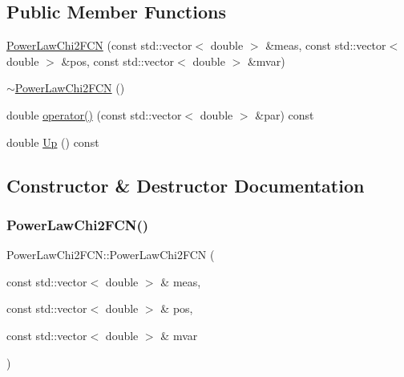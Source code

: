 \subsection*{Public Member Functions}
\begin{DoxyCompactItemize}
\item 
\mbox{\hyperlink{classPowerLawChi2FCN_a8a2490987d4db3ae4af6d45547c7c85e}{Power\+Law\+Chi2\+F\+CN}} (const std\+::vector$<$ double $>$ \&meas, const std\+::vector$<$ double $>$ \&pos, const std\+::vector$<$ double $>$ \&mvar)
\item 
\mbox{\hyperlink{classPowerLawChi2FCN_a7cc194ffd3e8e384faf890572c3a384d}{$\sim$\+Power\+Law\+Chi2\+F\+CN}} ()
\item 
double \mbox{\hyperlink{classPowerLawChi2FCN_a60b7b03daefc8250dcaaa2d4937f4bfc}{operator()}} (const std\+::vector$<$ double $>$ \&par) const
\item 
double \mbox{\hyperlink{classPowerLawChi2FCN_ad202014937fe0e66dffc0fa9061ca9df}{Up}} () const
\end{DoxyCompactItemize}


\subsection{Constructor \& Destructor Documentation}
\mbox{\label{classPowerLawChi2FCN_a8a2490987d4db3ae4af6d45547c7c85e}} 
\subsubsection{\texorpdfstring{PowerLawChi2FCN()}{PowerLawChi2FCN()}}
{\footnotesize\ttfamily Power\+Law\+Chi2\+F\+C\+N\+::\+Power\+Law\+Chi2\+F\+CN (\begin{DoxyParamCaption}\item[{const std\+::vector$<$ double $>$ \&}]{meas,  }\item[{const std\+::vector$<$ double $>$ \&}]{pos,  }\item[{const std\+::vector$<$ double $>$ \&}]{mvar }\end{DoxyParamCaption})\hspace{0.3cm}{\ttfamily [inline]}}

\mbox{\label{classPowerLawChi2FCN_a7cc194ffd3e8e384faf890572c3a384d}} 
